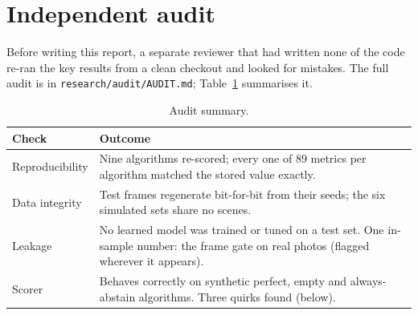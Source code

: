 \section{Independent audit}\label{sec:audit}

Before writing this report, a separate reviewer that had written none of the code re-ran the key results from a
clean checkout and looked for mistakes. The full audit is in \texttt{research/audit/AUDIT.md}; Table~\ref{tab:audit}
summarises it.

\begin{table}[H]
\centering\small
\caption{Audit summary.}\label{tab:audit}
\begin{tabularx}{\linewidth}{@{}lX@{}}
\toprule
Check & Outcome \\
\midrule
Reproducibility & Nine algorithms re-scored; every one of 89 metrics per algorithm matched the stored value exactly. \\
Data integrity & Test frames regenerate bit-for-bit from their seeds; the six simulated sets share no scenes. \\
Leakage & No learned model was trained or tuned on a test set. One in-sample number: the frame gate on real photos
          (flagged wherever it appears). \\
Scorer & Behaves correctly on synthetic perfect, empty and always-abstain algorithms. Three quirks found (below). \\
\bottomrule
\end{tabularx}
\end{table}

